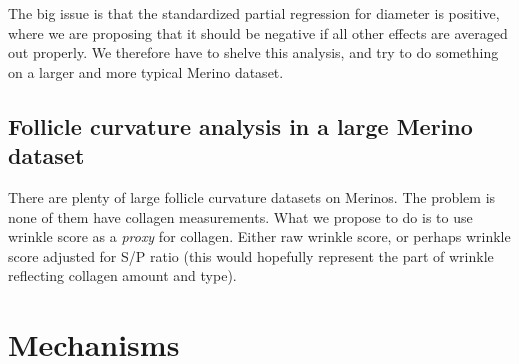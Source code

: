 \documentclass{article}
\begin{document}
The big issue is that the standardized partial regression for diameter is positive, where we are proposing that it should be negative if all other effects are averaged out properly.  We therefore have to shelve this analysis, and try to do something on a larger and more typical Merino dataset.


\subsection{ Follicle curvature analysis in a large Merino dataset}
 There are plenty of large follicle curvature datasets on Merinos. The problem is none of them have collagen measurements. What we propose to do is to use wrinkle score as a {\em proxy} for collagen. Either raw wrinkle score, or perhaps wrinkle score adjusted for S/P ratio (this would hopefully represent the part of wrinkle reflecting collagen amount and type).

\section{Mechanisms}




\end{document}
